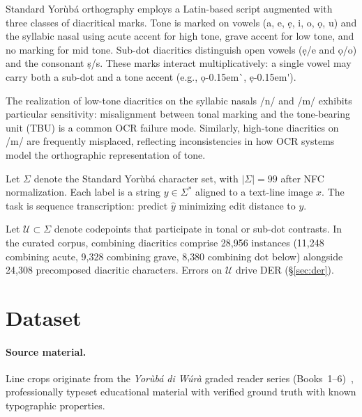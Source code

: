 \documentclass{article}
\newcommand{\Yoruba}{Yor\`ub\'a}
\begin{document}
Standard \Yoruba{} orthography employs a Latin-based script augmented with three classes of diacritical marks. Tone is marked on vowels (a, e, \d{e}, i, o, \d{o}, u) and the syllabic nasal using acute accent for high tone, grave accent for low tone, and no marking for mid tone. Sub-dot diacritics distinguish open vowels (\d{e}/e and \d{o}/o) and the consonant \d{s}/s. These marks interact multiplicatively: a single vowel may carry both a sub-dot and a tone accent (e.g., \d{o}\kern-0.15em\`{}, \d{e}\kern-0.15em\'{}).

The realization of low-tone diacritics on the syllabic nasals /n/ and /m/ exhibits particular sensitivity: misalignment between tonal marking and the tone-bearing unit (TBU) is a common OCR failure mode. Similarly, high-tone diacritics on /m/ are frequently misplaced, reflecting inconsistencies in how OCR systems model the orthographic representation of tone.

Let $\Sigma$ denote the Standard \Yoruba{} character set, with $|\Sigma|{=}99$ after NFC normalization. Each label is a string $y \in \Sigma^\ast$ aligned to a text-line image $x$. The task is sequence transcription: predict $\hat{y}$ minimizing edit distance to $y$.

Let $\mathcal{U} \subset \Sigma$ denote codepoints that participate in tonal or sub-dot contrasts. In the curated corpus, combining diacritics comprise 28{,}956 instances (11{,}248 combining acute, 9{,}328 combining grave, 8{,}380 combining dot below) alongside 24{,}308 precomposed diacritic characters. Errors on $\mathcal{U}$ drive DER (\S\ref{sec:der}).

\section{Dataset}

\paragraph{Source material.}
Line crops originate from the \emph{\Yoruba{} di W\'ur\`a} graded reader series (Books~1--6)~\cite{oyedele2020ydw}, professionally typeset educational material with verified ground truth with known typographic properties.
\end{document}
